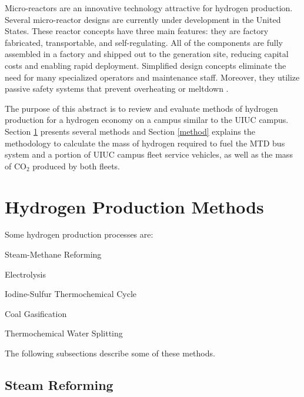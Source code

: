 \documentclass{anstrans}
\begin{document}
Micro-reactors are an innovative technology attractive for hydrogen production. Several micro-reactor designs are currently under development in the United States. These reactor concepts have three main features: they are factory fabricated, transportable, and self-regulating. All of the components are fully assembled in a factory and shipped out to the generation site, reducing capital costs and enabling rapid deployment. Simplified design concepts eliminate the need for many specialized operators and maintenance staff. Moreover, they utilize passive safety systems that prevent overheating or meltdown \cite{us-doe_ultimate_2019}.

The purpose of this abstract is to review and evaluate methods of hydrogen production for a hydrogen economy on a campus similar to the \gls{UIUC} campus.
Section \ref{section:hydroprod} presents several methods and Section \ref{method} explains the methodology to calculate the mass of hydrogen required to fuel the \gls{MTD} bus system and a portion of \gls{UIUC} campus fleet service vehicles, as well as the mass of CO$_2$ produced by both fleets.

\section{Hydrogen Production Methods}
\label{section:hydroprod}

Some hydrogen production processes are: 
\begin{description}[font=$\bullet$\scshape\bfseries]
	\item[] Steam-Methane Reforming \cite{doe_office_of_energy_efficiency_and_renewable_energy_hydrogen_2020}
	\item[] Electrolysis \cite{doe_office_of_energy_efficiency_and_renewable_energy_hydrogen_2020}
	\item[] Iodine-Sulfur Thermochemical Cycle \cite{cea_gas-cooled_2006}
	\item[] Coal Gasification \cite{office_of_energy_efficiency_and_renewable_energy_coal_gas_2020}
	\item[] Thermochemical Water Splitting \cite{office_of_energy_efficiency_and_renewable_energy_thermo_water_2020}
\end{description}

The following subsections describe some of these methods.

\subsection{Steam Reforming}
\end{document}
